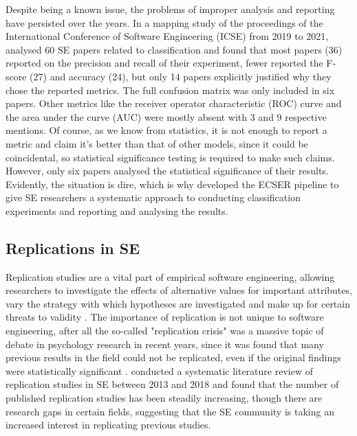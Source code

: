 \documentclass[a4paper]{article}
\begin{document}
Despite being a known issue, the problems of improper analysis and reporting have persisted over the years. In a mapping study of the proceedings of the International Conference of Software Engineering (ICSE) from 2019 to 2021, \textcite{Dellanna2022} analysed 60 SE papers related to classification and found that most papers (36) reported on the precision and recall of their experiment, fewer reported the F-score (27) and accuracy (24), but only 14 papers explicitly justified why they chose the reported metrics. The full confusion matrix was only included in six papers. Other metrics like the receiver operator characteristic (ROC) curve and the area under the curve (AUC) were mostly absent with 3 and 9 respective mentions. Of course, as we know from statistics, it is not enough to report a metric and claim it's better than that of other models, since it could be coincidental, so statistical significance testing is required to make such claims. However, only six papers analysed the statistical significance of their results. Evidently, the situation is dire, which is why \citeauthor{Dellanna2022} developed the ECSER pipeline to give SE researchers a systematic approach to conducting classification experiments and reporting and analysing the results. 

\subsection{Replications in SE}
Replication studies are a vital part of empirical software engineering, allowing researchers to investigate the effects of alternative values for important attributes, vary the strategy with which hypotheses are investigated and make up for certain threats to validity \cite{Basili1999}. The importance of replication is not unique to software engineering, after all the so-called "replication crisis" was a massive topic of debate in psychology research in recent years, since it was found that many previous results in the field could not be replicated, even if the original findings were statistically significant \cite{Shrout2018,Maxwell2015,Amrhein2018}. \textcite{Cruz2020} conducted a systematic literature review of replication studies in SE between 2013 and 2018 and found that the number of published replication studies has been steadily increasing, though there are research gaps in certain fields, suggesting that the SE community is taking an increased interest in replicating previous studies.
\end{document}
